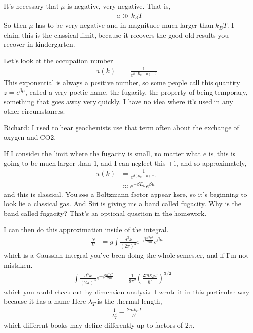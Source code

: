 It's necessary that $\mu$ is negative,
very negative.
That is,
\begin{align}
    - \mu \gg k_B T
\end{align}
So then $\mu$ has to be very negative and in magnitude much larger than
$k_BT$.
I claim this is the classical limit,
because it recovers the good old results you recover in kindergarten.

Let's look at the occupation number
\begin{align}
    n(k) &=
    \frac{1}{e^{\beta\left( E_k - \mu \right) \mp 1}}
\end{align}
This exponential is always a positive number,
so some people call this quantity
$z = e^{\beta \mu}$,
called a very poetic name,
the fugacity,
the property of being temporary,
something that goes away very quickly.
I have no idea where it's used in any other circumstances.

Richard: I used to hear geochemists use that term often about the exchange of
oxygen and CO2.

If I consider the limit where the fugacity is small,
no matter what $e$ is,
this is going to be much larger than 1,
and I can neglect this $\mp 1$,
and so approximately,
\begin{align}
    n(k) &=
    \frac{1}{e^{\beta\left( E_k - \mu \right) \mp 1}}\\
    &\approx 
    e^{-\beta E_k} e^{\beta \mu}
\end{align}
and this is classical.
You see a Boltzmann factor appear here,
so it's beginning to look lie a classical gas.
And Siri is giving me a band called fugacity.
Why is the band called fugacity?
That's an optional question in the homework.

I can then do this approximation inside of the integral.
\begin{align}
    \frac{N}{V} &=
    g \int \frac{d^3k}{(2\pi)^3}
    e^{-\beta \frac{\hbar^2 k^2}{2m}} e^{\beta\mu}
\end{align}
which is a Gaussian integral you've been doing the whole semester,
and if I'm not mistaken.
\begin{align}
    \int \frac{d^3k}{(2\pi)^3}
    e^{-\beta \frac{\hbar^2 k^2}{2m}}
    &=
    \frac{1}{8\pi^2}
    \left( \frac{2mk_B T}{\hbar^2} \right)^{3/2}
    = 
\end{align}
which you could check out by dimension analysis.
I wrote it in this particular way because it has a name
Here $\lambda_T$ is the thermal length,
\begin{align}
    \frac{1}{\lambda_T^2}
    =
    \frac{2mk_B T}{\hbar^2}
\end{align}
which different books may define differently up to factors of $2\pi$.


